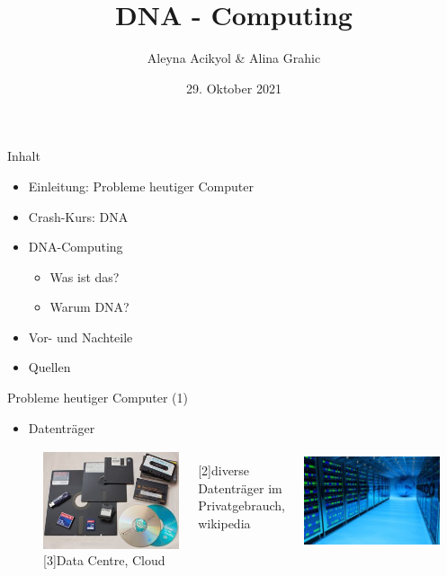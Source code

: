 \documentclass{beamer}
\title{DNA - Computing}
\author{Aleyna Acikyol \& Alina Grahic}
\date{29. Oktober 2021}
\begin{document}
\begin{frame}[plain]
    \maketitle
\end{frame}
\begin{frame}{Inhalt}
	\begin{itemize}
	\item Einleitung: Probleme heutiger Computer
	\pause	
	\item Crash-Kurs: DNA
	\pause
	\item DNA-Computing	
	\begin{itemize}
		\item 	Was ist das?
		\item Warum DNA?	
	\end{itemize}
	\pause
	\item Vor- und Nachteile
	\pause
	\item Quellen
\end{itemize}
\end{frame}

\begin{frame}{Probleme heutiger Computer (1)}
	\begin{itemize}
	\item	Datenträger
	\end{itemize}

\begin{figure}	
		\begin{columns}
			\centering
			\includegraphics[height=3cm, width=4cm]{./3.jpg}\caption{[2]diverse Datenträger im Privatgebrauch, wikipedia}
			
			\centering
			\includegraphics[height=3cm, width=4cm]{./3.2.jpg}\caption{[3]Data Centre, Cloud}
		\end{columns} 
\end{figure}
\end{frame}
\end{document}
